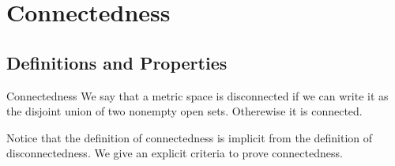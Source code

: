 \documentclass[a4paper]{article}
\begin{document}
\pagebreak
\section{Connectedness}
\subsection{Definitions and Properties}
\begin{defn}{Connectedness}{} We say that a metric space is disconnected if we can write it as the disjoint union of two nonempty open sets. Otherewise it is connected. 
\end{defn}

Notice that the definition of connectedness is implicit from the definition of disconnectedness. We give an explicit criteria to prove connectedness. 
\end{document}
